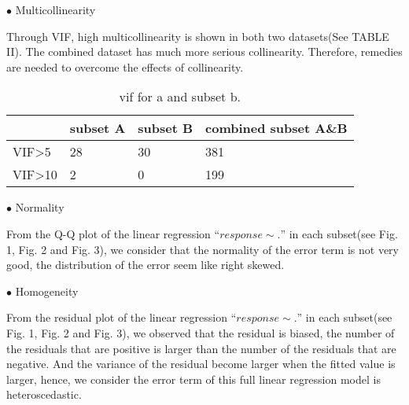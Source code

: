 \documentclass[conference,letterpaper]{IEEEtran}
\begin{document}
 
$\bullet$ {\fontsize{11}{13}\selectfont Multicollinearity}

{\fontsize{11}{13}\selectfont Through VIF, high multicollinearity is shown in both two datasets(See TABLE II). The combined dataset has much more serious collinearity. Therefore, remedies are needed to overcome the effects of collinearity. 
}
\begin{table}
	\centering
	\caption{\lowercase{\normalsize \MakeUppercase{VIF} for \MakeUppercase{a} and subset \MakeUppercase{b}.}}
	\label{tab:table_2}
	\begin{tabular}{M{1.5cm}M{2cm}M{2cm}M{2cm}} %
		\hline
		 & \normalsize subset A &  \normalsize subset B&  \normalsize combined subset A\&B \\
		\hline
		  \normalsize VIF\textgreater 5&  28 &   30&   381\\
		 \normalsize VIF\textgreater10&  2 &  0 &   199 \\
		\hline
	\end{tabular}
\end{table}


$\bullet$ {\fontsize{11}{13}\selectfont Normality}

{\fontsize{11}{13}\selectfont From the Q-Q plot of the linear regression ``$response \sim . $'' in each subset(see Fig. 1, Fig. 2 and Fig. 3), we consider that the normality of the error term is  not very good, the distribution of the error seem like right skewed.  
}


$\bullet$ {\fontsize{11}{13}\selectfont Homogeneity}

{\fontsize{11}{13}\selectfont From the residual plot of the linear regression ``$response \sim . $'' in each subset(see Fig. 1, Fig. 2 and Fig. 3), we observed that the residual is biased, the number of the residuals that are positive is larger than the number of the residuals that are negative. And the variance of the residual become larger when the fitted value is larger, hence, we consider the error term of this full linear regression model is heteroscedastic. 

 }
\end{document}
